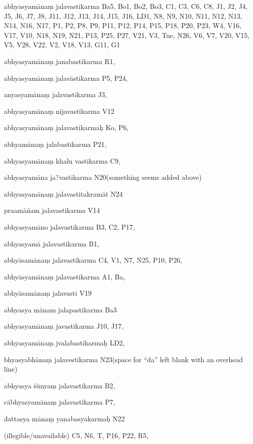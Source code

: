 \begin{marma}[hp02_009]
\begin{marma}[hp02_011]
\begin{marma}[hp02_29c]
\begin{description}
    \end{description}
 \end{marma}

 \begin{marma}[hp02_29d]
\item[abhyasyamānaṃ jalavastikarma] Ba5, Bo1, Bo2, Bo3, C1, C3, C6, C8, J1, J2, J4, J5, J6, J7, J8, J11, J12, J13, J14, J15, J16, LD1, N8, N9, N10, N11, N12, N13, N14, N16, N17, P1, P2, P8, P9, P11,  P12, P14, P15, P18, P20, P23, W4, V16, V17, V10, N18, N19, N21, P13, P25, P27, V21, V3, Tue, N26, V6, V7, V20, V15, V5, V28, V22, V2, V18, V13, G11, G1
\item[abhyasyamānaṃ janabastikarma] R1,
\item[abhyasyamānaṃ jalavāstikarma] P5, P24, 
\item[anyasyamānaṃ jalavastikarma] J3,
\item[abhyasyamānaṃ nijavastikarma] V12
\item[abhyasyamānaṃ jalavastikarmaḥ] Ko, P6, 
\item[abhyamānaṃ jalabastikarma] P21, 
\item[abhyasyamānaṃ khalu vastikarma] C9,
\item[abhyasyamāna ja?vastikarma] N20(something seems added above)
\item[abhyasyamānaṃ jalavastitakramāt] N24
\item[praamāńam jalavastikarma] V14
\item[abhyasyamāno jalavastikarma] B3, C2, P17, 
\item[abhyasyamā jalavastikarma] B1,
\item[abhyāsamānaṃ jalavastikarma] C4, V1, N7, N25, P10, P26, 
\item[abhyāsyamānaṃ jalavastikarma] A1, Ba,
\item[abhyāsamānaṃ jalavasti] V19
\item[abhyasya mānam jalapastikarma] Ba3
\item[abhyasyamānaṃ javastikarma] J10, J17,
\item[abhyasyamānaṃ jvalabastikarmaḥ] LD2,
\item[bhyasyabhānaṃ jalavestikarma] N23(space for “da” left blank with an overhead line)
\item[abhyasya śūnyaṃ jalavastikarma] B2,
\item[cābhyasyamānaṃ jalavastikarma] P7, 
\item[dattasya mānaṃ yanabasyakarmaḥ] N22
\item[(illegible/unavailable)] C5, N6, T, P16, P22, R5,
  \begin{description}


\end{description}
\end{marma}
\end{marma}
\end{marma}
